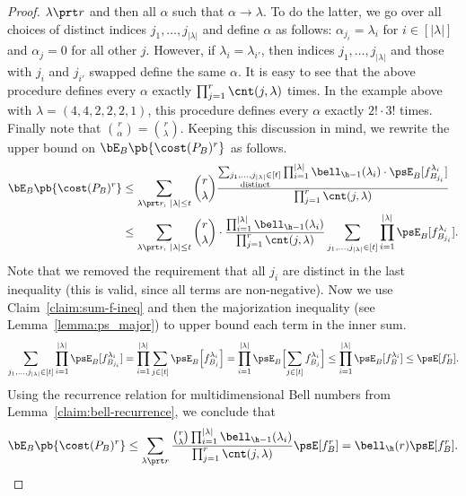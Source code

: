 \documentclass[11pt,a4paper]{article}
\begin{document}
\begin{proof}
$\lambda \prt r$ and then all $\alpha$ such that $\alpha\to \lambda$. To do the latter, we go over all choices of distinct indices $j_1, \dots, j_{|\lambda|}$ and define $\alpha$ as follows: $\alpha_{j_i}=\lambda_i$ for $i\in [|\lambda|]$ and $\alpha_j = 0$ for all other $j$. However, if $\lambda_i = \lambda_{i'}$, then indices $j_1, \dots, j_{|\lambda|}$ and those with $j_i$ and $j_{i'}$ swapped define the same $\alpha$. It is easy to see that the above procedure defines every $\alpha$ exactly $\prod_{j=1}^r \cnt(j,\lambda)$ times. In the example above with $\lambda = (4,4,2,2,2,1)$, this procedure defines every $\alpha$ exactly $2!\cdot 3!$ times. Finally note that $\binom{r}{\alpha} = \binom{r}{\lambda}$.
Keeping this discussion in mind, we rewrite the upper bound on  $\bE_B\pb{\cost(P_B)^r}$ as follows.
\begin{align*}
         \bE_B\pb{\cost(P_B)^r} &
         \le \sum_{\lambda \prt r, ~|\lambda| \le t} \binom{r}{\lambda}  \frac{\sum_{\substack{j_1, \ldots, j_{|\lambda|} \in [t] \\ \text{distinct}}}\prod_{i=1}^{|\lambda|}
        \bell_{\h-1}(\lambda_i)\cdot \psE_{B} [f_{B_{j_i}}^{\lambda_i}] }{\prod_{j=1}^r \cnt(j,\lambda)}
        \\ 
        &\leq \sum_{\lambda \prt r, ~|\lambda| \le t} \binom{r}{\lambda} \cdot\frac{\prod_{i=1}^{|\lambda|} 
        \bell_{\h-1}(\lambda_i)}{\prod_{j=1}^r \cnt(j,\lambda)}  \sum_{j_1, \ldots, j_{|\lambda|} \in [t]} \prod_{i=1}^{|\lambda|}  \psE_{B}[ f_{B_{j_i}}^{\lambda_i}].
\end{align*}
Note that we removed the requirement that all $j_i$ are distinct in the last inequality (this is valid, since all terms are non-negative). Now we use Claim~\ref{claim:sum-f-ineq} and then the majorization inequality (see Lemma~\ref{lemma:ps_major}) to upper bound each term in the inner sum.
$$\sum_{j_1, \ldots, j_{|\lambda|} \in [t]} \prod_{i=1}^{|\lambda|}  \psE_{B}[ f_{B_{j_i}}^{\lambda_i}]
= \prod_{i=1}^{|\lambda|} \sum_{j\in [t]} \psE_{B}\Bigl[f_{B_{j}}^{\lambda_i}\Bigr]
=
\prod_{i=1}^{|\lambda|}  \psE_{B}\Bigl[\sum_{j\in [t]}f_{B_{j}}^{\lambda_i}\Bigr]
\leq 
\prod_{i=1}^{|\lambda|} \psE_{B}[ f_{B}^{\lambda_i}] \leq \psE[f_B^r].
$$
Using the recurrence relation for multidimensional Bell numbers from Lemma~\ref{claim:bell-recurrence}, we conclude that
$$\bE_B\pb{\cost(P_B)^r} \leq 
 \sum_{\lambda \prt r} \frac{\binom{r}{\lambda} \prod_{i=1}^{|\lambda|}
        \bell_{\h-1}(\lambda_i)}{\prod_{j=1}^r \cnt(j,\lambda)} \psE[f_B^r] = \bell_\h(r) \psE[f_B^r].
$$
\end{proof}
\end{document}
